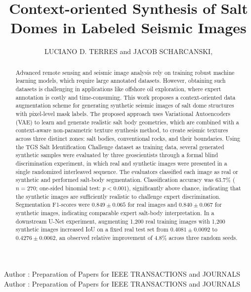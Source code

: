 \documentclass{ieeeaccess}
\begin{document}

\title{Context-oriented Synthesis of Salt Domes in Labeled Seismic Images}
\author{\uppercase{Luciano D. Terres} and
\uppercase{Jacob Scharcanski},  }

\address[1]{Institute of Informatics,
Federal University of Rio Grande do Sul, Porto Alegre, RS, Brasil, 91501-970 (e-mail: ldterres@inf.ufrgs.br; jacobs@inf.ufrgs.br)}

\markboth
{Author \headeretal: Preparation of Papers for IEEE TRANSACTIONS and JOURNALS}
{Author \headeretal: Preparation of Papers for IEEE TRANSACTIONS and JOURNALS}



\begin{abstract}
Advanced remote sensing and seismic image analysis rely on training robust machine learning models, which require large annotated datasets. However, obtaining such datasets is challenging in applications like offshore oil exploration, where expert annotation is costly and time-consuming. This work proposes a context-oriented data augmentation scheme for generating synthetic seismic images of salt dome structures with pixel-level mask labels. The proposed approach uses Variational Autoencoders (VAE) to learn and generate realistic salt body geometries, which are combined with a context-aware non-parametric texture synthesis method, to create seismic textures across three distinct zones: salt bodies, conventional rocks, and their boundaries. Using the TGS Salt Identification Challenge dataset as training data, several generated synthetic samples were evaluated by three geoscientists through a formal blind discrimination experiment, in which real and synthetic images were presented in a single randomized interleaved sequence. The evaluators classified each image as real or synthetic and performed salt-body segmentation. Classification accuracy was 63.7\% ($n=270$; one-sided binomial test: $p < 0.001$), significantly above chance, indicating that the synthetic images are sufficiently realistic to challenge expert discrimination. Segmentation F1-scores were $0.849 \pm 0.065$ for real images and $0.840 \pm 0.067$ for synthetic images, indicating comparable expert salt-body interpretation. In a downstream U-Net experiment, augmenting 1,200 real training images with 1,200 synthetic images increased IoU on a fixed real test set from $0.4081 \pm 0.0092$ to $0.4276 \pm 0.0062$, an observed relative improvement of 4.8\% across three random seeds.
\end{abstract}
\end{document}
